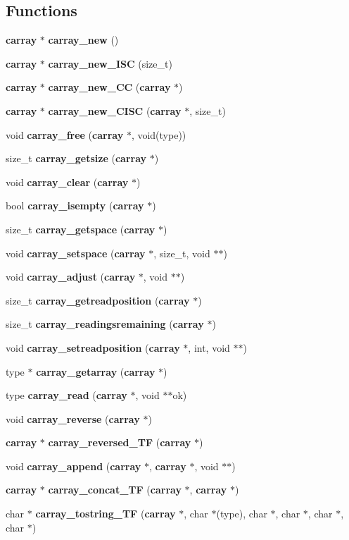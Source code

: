 \subsection*{Functions}
\begin{DoxyCompactItemize}
\item 
{\bf carray} $\ast$ {\bf carray\+\_\+new} ()
\item 
{\bf carray} $\ast$ {\bf carray\+\_\+new\+\_\+\+I\+SC} (size\+\_\+t)
\item 
{\bf carray} $\ast$ {\bf carray\+\_\+new\+\_\+\+CC} ({\bf carray} $\ast$)
\item 
{\bf carray} $\ast$ {\bf carray\+\_\+new\+\_\+\+C\+I\+SC} ({\bf carray} $\ast$, size\+\_\+t)
\item 
void {\bfseries carray\+\_\+free} ({\bf carray} $\ast$, void(type))\label{group__method__group_ga07e0bf89d4437f8fe81c79101c3ca92c}

\item 
size\+\_\+t {\bf carray\+\_\+getsize} ({\bf carray} $\ast$)
\item 
void {\bf carray\+\_\+clear} ({\bf carray} $\ast$)
\item 
bool {\bf carray\+\_\+isempty} ({\bf carray} $\ast$)
\item 
size\+\_\+t {\bf carray\+\_\+getspace} ({\bf carray} $\ast$)
\item 
void {\bf carray\+\_\+setspace} ({\bf carray} $\ast$, size\+\_\+t, void $\ast$$\ast$)
\item 
void {\bf carray\+\_\+adjust} ({\bf carray} $\ast$, void $\ast$$\ast$)
\item 
size\+\_\+t {\bf carray\+\_\+getreadposition} ({\bf carray} $\ast$)
\item 
size\+\_\+t {\bf carray\+\_\+readingsremaining} ({\bf carray} $\ast$)
\item 
void {\bf carray\+\_\+setreadposition} ({\bf carray} $\ast$, int, void $\ast$$\ast$)
\item 
type $\ast$ {\bf carray\+\_\+getarray} ({\bf carray} $\ast$)
\item 
type {\bf carray\+\_\+read} ({\bf carray} $\ast$, void $\ast$$\ast$ok)
\item 
void {\bf carray\+\_\+reverse} ({\bf carray} $\ast$)
\item 
{\bf carray} $\ast$ {\bf carray\+\_\+reversed\+\_\+\+TF} ({\bf carray} $\ast$)
\item 
void {\bf carray\+\_\+append} ({\bf carray} $\ast$, {\bf carray} $\ast$, void $\ast$$\ast$)
\item 
{\bf carray} $\ast$ {\bf carray\+\_\+concat\+\_\+\+TF} ({\bf carray} $\ast$, {\bf carray} $\ast$)
\item 
char $\ast$ {\bfseries carray\+\_\+tostring\+\_\+\+TF} ({\bf carray} $\ast$, char $\ast$(type), char $\ast$, char $\ast$, char $\ast$, char $\ast$)\label{group__method__group_ga8c5907136724e99dc8212d9c333ab027}


\end{DoxyCompactItemize}
